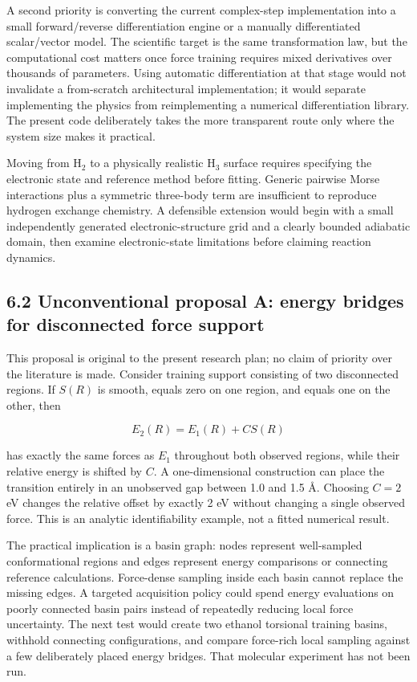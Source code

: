 \documentclass[
  11pt,
  a4paper,
]{article}
\begin{document}
A second priority is converting the current complex-step implementation
into a small forward/reverse differentiation engine or a manually
differentiated scalar/vector model. The scientific target is the same
transformation law, but the computational cost matters once force
training requires mixed derivatives over thousands of parameters. Using
automatic differentiation at that stage would not invalidate a
from-scratch architectural implementation; it would separate
implementing the physics from reimplementing a numerical differentiation
library. The present code deliberately takes the more transparent route
only where the system size makes it practical.

Moving from H\(_2\) to a physically realistic H\(_3\) surface requires
specifying the electronic state and reference method before fitting.
Generic pairwise Morse interactions plus a symmetric three-body term are
insufficient to reproduce hydrogen exchange chemistry. A defensible
extension would begin with a small independently generated
electronic-structure grid and a clearly bounded adiabatic domain, then
examine electronic-state limitations before claiming reaction dynamics.

\hypertarget{unconventional-proposal-a-energy-bridges-for-disconnected-force-support}{%
\subsection{6.2 Unconventional proposal A: energy bridges for
disconnected force
support}\label{unconventional-proposal-a-energy-bridges-for-disconnected-force-support}}

This proposal is original to the present research plan; no claim of
priority over the literature is made. Consider training support
consisting of two disconnected regions. If \(S(R)\) is smooth, equals
zero on one region, and equals one on the other, then

\[E_2(R)=E_1(R)+C S(R)\]

has exactly the same forces as \(E_1\) throughout both observed regions,
while their relative energy is shifted by \(C\). A one-dimensional
construction can place the transition entirely in an unobserved gap
between 1.0 and 1.5 Å. Choosing \(C=2\) eV changes the relative offset
by exactly 2 eV without changing a single observed force. This is an
analytic identifiability example, not a fitted numerical result.

The practical implication is a basin graph: nodes represent well-sampled
conformational regions and edges represent energy comparisons or
connecting reference calculations. Force-dense sampling inside each
basin cannot replace the missing edges. A targeted acquisition policy
could spend energy evaluations on poorly connected basin pairs instead
of repeatedly reducing local force uncertainty. The next test would
create two ethanol torsional training basins, withhold connecting
configurations, and compare force-rich local sampling against a few
deliberately placed energy bridges. That molecular experiment has not
been run.
\end{document}
